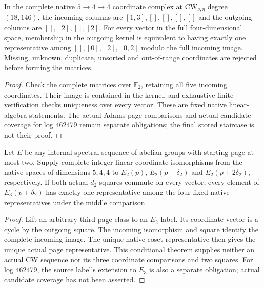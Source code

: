 \begin{lemma}
  \label{lem:lin-cw-native-d2-quotient}
  \leanok
  In the complete native $5\to4\to4$ coordinate complex at
  $\mathrm{CW}_{\nu,\eta}$ degree $(18,146)$, the incoming columns are
  $[1,3],[],[],[],[]$ and the outgoing columns are $[],[2],[],[2]$.
  For every vector in the full four-dimensional space, membership in the
  outgoing kernel is equivalent to having exactly one representative
  among $[],[0],[2],[0,2]$ modulo the full incoming image.
  Missing, unknown, duplicate, unsorted and out-of-range coordinates
  are rejected before forming the matrices.
\end{lemma}
\begin{proof}
  \leanok
  Check the complete matrices over $\mathbb F_2$, retaining all five
  incoming coordinates. Their image is contained in the kernel, and
  exhaustive finite verification checks uniqueness over every vector.
  These are fixed native linear-algebra statements. The actual Adams
  page comparisons and actual candidate coverage for log 462479 remain
  separate obligations; the final stored staircase is not their proof.
\end{proof}

\begin{lemma}
  \label{lem:lin-cw-page-three-transport}
  \leanok
  Let $E$ be any internal spectral sequence of abelian groups with
  starting page at most two. Supply complete integer-linear coordinate
  isomorphisms from the native spaces of dimensions $5,4,4$ to
  $E_2(p)$, $E_2(p+\delta_2)$ and $E_2(p+2\delta_2)$, respectively.
  If both actual $d_2$ squares commute on every vector, every element
  of $E_3(p+\delta_2)$ has exactly one representative among the four
  fixed native representatives under the middle comparison.
\end{lemma}
\begin{proof}
  \leanok
  Lift an arbitrary third-page class to an $E_2$ label. Its coordinate
  vector is a cycle by the outgoing square. The incoming isomorphism
  and square identify the complete incoming image. The unique native
  coset representative then gives the unique actual page representative.
  This conditional theorem supplies neither an actual CW sequence nor
  its three coordinate comparisons and two squares. For log 462479,
  the source label's extension to $E_3$ is also a separate obligation;
  actual candidate coverage has not been asserted.
\end{proof}


